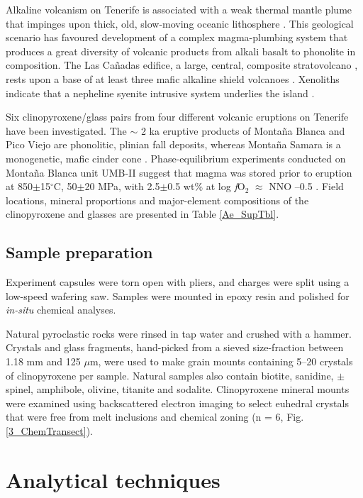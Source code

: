 \documentclass[review,authoryear,12pt]{elsarticle}
\newcommand{\dgCs}{$^\circ$C}
\newcommand{\fO}{\textit{f}O$_{2}$ }
\begin{document}
Alkaline volcanism on Tenerife is associated with a weak thermal mantle plume that impinges upon thick, old, slow-moving oceanic lithosphere \citep{Carracedo2007}. This geological scenario has favoured development of a complex magma-plumbing system that produces a great diversity of volcanic products from alkali basalt to phonolite in composition. The Las Ca\~nadas edifice, a large, central, composite stratovolcano \citep{Bryan1998,Brown2003,Edgar2007}, rests upon a base of at least three mafic alkaline shield volcanoes \citep{Thirlwall2000,Guillou2004,Gurenko2006}. Xenoliths indicate that a nepheline syenite intrusive system underlies the island \citep{Wiesmaier2012}.

Six clinopyroxene/glass pairs from four different volcanic eruptions on Tenerife have been investigated. The $\sim$ 2 ka eruptive products of Monta\~na Blanca and Pico Viejo \citep{Ablay1995} are phonolitic, plinian fall deposits, whereas Monta\~na Samara is a monogenetic, mafic cinder cone \citep{Albert2015}. Phase-equilibrium experiments conducted on Monta\~na Blanca unit UMB-II suggest that magma was stored prior to eruption at 850$\pm$15\dgCs, 50$\pm$20 MPa, with 2.5$\pm$0.5 wt\%  at log \fO $\approx$ NNO --0.5  \citep{Andujar2012}. Field locations, mineral proportions and major-element compositions of the clinopyroxene and glasses are presented in Table \ref{Ae_SupTbl}.

\subsection{Sample preparation}
Experiment capsules were torn open with pliers, and charges were split using a low-speed wafering saw. Samples were mounted in epoxy resin and polished for \textit{in-situ} chemical analyses.

Natural pyroclastic rocks were rinsed in tap water and crushed with a hammer. Crystals and glass fragments, hand-picked from a sieved size-fraction between 1.18 mm and 125 $\mu$m, were used to make grain mounts containing 5--20 crystals of clinopyroxene per sample. Natural samples also contain biotite, sanidine, $\pm$ spinel, amphibole, olivine, titanite and sodalite. Clinopyroxene mineral mounts were examined using backscattered electron imaging to select euhedral crystals that were free from melt inclusions and chemical zoning (n = 6, Fig. \ref{3_ChemTransect}).


\section{Analytical techniques}
\end{document}
